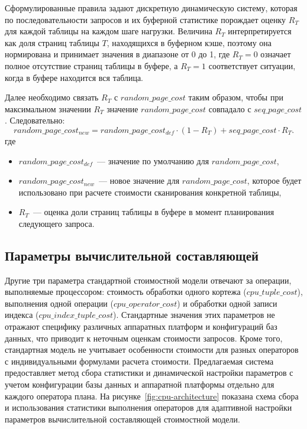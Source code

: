 Сформулированные правила задают дискретную динамическую систему, которая по последовательности запросов и их буферной статистике порождает оценку \(R_T\) для каждой таблицы на каждом шаге нагрузки. Величина \(R_T\) интерпретируется как доля страниц таблицы \(T\), находящихся в буферном кэше, поэтому она нормирована и принимает значения в диапазоне от 0 до 1, где \(R_T=0\) означает полное отсутствие страниц таблицы в буфере, а \(R_T=1\) соответствует ситуации, когда в буфере находится вся таблица.

Далее необходимо связать $R_T$ с \(random\_page\_cost\) таким образом, чтобы при максимальном значении $R_T$ значение \(random\_page\_cost\) совпадало с \(seq\_page\_cost\). Следовательно:
\begin{equation}
random\_page\_cost_{new} =
random\_page\_cost_{def} \cdot (1 - R_T) + seq\_page\_cost \cdot R_T.
\label{eq:rpc_calibration}
\end{equation}
где
\begin{itemize}
    \item \(random\_page\_cost_{def}\)~--- значение по умолчанию для \(random\_page\_cost\),
    \item \(random\_page\_cost_{new}\)~--- новое значение для \(random\_page\_cost\), которое будет использовано при расчете стоимости сканирования конкретной таблицы,
    \item \(R_T\)~--- оценка доли страниц таблицы в буфере в момент планирования следующего запроса.
\end{itemize}

\subsection{Параметры вычислительной составляющей}
Другие три параметра стандартной стоимостной модели отвечают за операции,
выполняемые процессором: стоимость обработки одного кортежа (\(cpu\_tuple\_cost\)),
выполнения одной операции (\(cpu\_operator\_cost\)) и обработки одной записи индекса
(\(cpu\_index\_tuple\_cost\)). Стандартные значения этих параметров не отражают специфику
различных аппаратных платформ и конфигураций баз данных, что приводит к неточным
оценкам стоимости запросов. Кроме того, стандартная модель не учитывает
особенности стоимости для разных операторов с индивидуальными формулами расчета
стоимости. Предлагаемая система предоставляет метод сбора статистики и
динамической настройки параметров с учетом конфигурации базы данных и аппаратной
платформы отдельно для каждого оператора плана. На рисунке~\cref{fig:cpu-architecture} показана схема сбора и использования статистики выполнения операторов для адаптивной настройки параметров вычислительной составляющей стоимостной модели.

